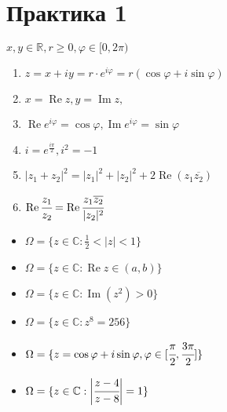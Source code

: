 
\section{Практика 1}
\begin{remrk} \hfill \newline
    $ x, y \in \mathbb{R}, r \geq 0, \varphi \in [0, 2\pi)$
    \begin{enumerate}
        \item $z = x + iy = r \cdot e^{i \varphi} = r(\cos \varphi + i \sin \varphi)$
        \item $x = \operatorname{Re} z, y = \operatorname{Im} z, $
        \item $\operatorname{Re} e^{i \varphi} = \cos \varphi, \operatorname{Im} e^{i \varphi} = \sin \varphi$
        \item $i = e^{\frac{i\pi}{2}}, i^2 = -1$
        \item $|z_1+ z_2|^2 = |z_1|^2 + |z_2|^2 + 2\operatorname{Re}(z_1 \overline{z_2})$
        \item $\operatorname{Re} \cfrac{z_1}{z_2} = \operatorname{Re} \cfrac{z_1\overline{z_2}}{|z_2|^2}$
    \end{enumerate}
\end{remrk}


\begin{problem*}  \hfill \newline
    \begin{itemize}
        \item $\Omega = \{z \in \mathbb{C}: \frac{1}{2} < |z| < 1\}$
        \item $\Omega = \{z \in \mathbb{C}: \operatorname{Re} z \in (a, b)\}$
        \item $\Omega = \{z \in \mathbb{C}: \operatorname{Im}(z^2) > 0\}$
        \item $\Omega = \{z \in \mathbb{C}: z^8 = 256\}$
        \item $\Omega = \{z= \cos\varphi + i \sin \varphi,\varphi\in [\cfrac{\pi}{2}, \cfrac{3\pi}{2}]\}$
        \item $\Omega = \{z \in \mathbb{C}: \bigg| \cfrac{z - 4}{z - 8}\bigg| = 1\}$
    \end{itemize}
\end{problem*}

